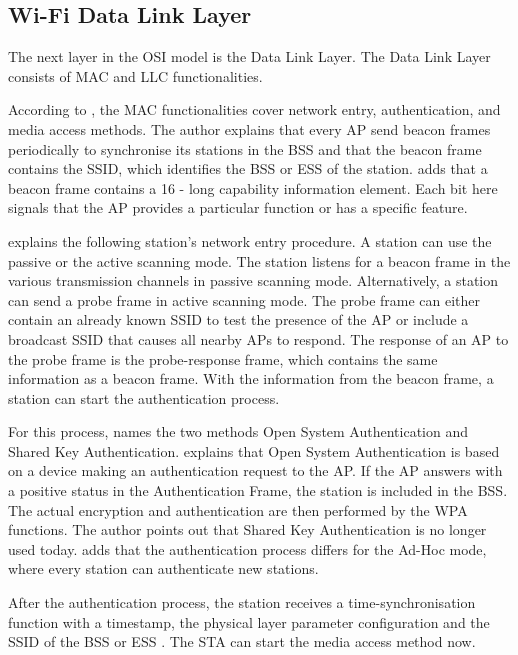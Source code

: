 \subsection*{Wi-Fi Data Link Layer}

The next layer in the OSI model is the Data Link Layer.
The Data Link Layer consists of MAC and LLC functionalities.


According to \textcite[207]{kauffels_wireless_2002}, the MAC functionalities cover network entry, authentication, and media access methods.
The author explains that every \ac{AP} send beacon frames periodically to synchronise its stations in the \ac{BSS} and that the beacon frame contains the \ac{SSID}, which identifies the \ac{BSS} or \ac{ESS} of the station.
\textcite[275-276]{sauter_wireless_2022} adds that a beacon frame contains a \SI{16}{\bit} - long capability information element. Each bit here signals that the \ac{AP} provides a particular function or has a specific feature.

\textcite[220,221]{kauffels_wireless_2002} explains the following station's network entry procedure.
A station can use the passive or the active scanning mode.
The station listens for a beacon frame in the various transmission channels in passive scanning mode.
Alternatively, a station can send a probe frame in active scanning mode.
The probe frame can either contain an already known \ac{SSID} to test the presence of the \ac{AP} or include a broadcast SSID that causes all nearby \ac{AP}s to respond.
The response of an \ac{AP} to the probe frame is the probe-response frame, which contains the same information as a beacon frame.
With the information from the beacon frame, a station can start the authentication process.

For this process, \textcite[221,222]{kauffels_wireless_2002} names the two methods Open System Authentication and Shared Key Authentication.
\textcite[277]{sauter_wireless_2022} explains that Open System Authentication is based on a device making an authentication
request to the \ac{AP}.
If the \ac{AP} answers with a positive status in the Authentication Frame,
the station is included in the \ac{BSS}.
The actual encryption and authentication are then performed by the \ac{WPA} functions.
The author points out that Shared Key Authentication is no longer used today.
\textcite[122]{sommer_vehicular_2014} adds that the authentication process differs for the Ad-Hoc mode, where every station can
authenticate new stations.

After the authentication process, the station receives a time-synchronisation function with a timestamp, the physical layer
parameter configuration and the \ac{SSID} of the \ac{BSS} or \ac{ESS} \cite[220]{kauffels_wireless_2002}.
The \ac{STA} can start the media access method now.

